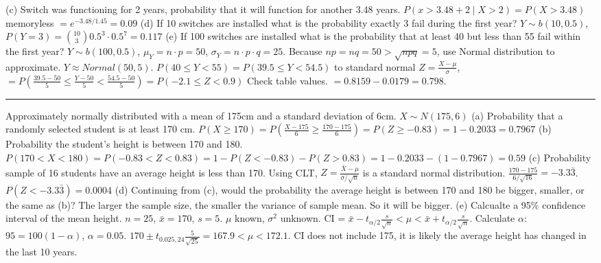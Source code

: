 \documentclass[9pt]{article}
\newcommand*\mean[1]{\bar{#1}}
\begin{document}
\begin{multicols*}{2}
    (c) Switch was functioning for 2 years, probability that it will function for another 3.48 years.
    $P(x > 3.48 + 2 \mid X>2) = P(X > 3.48) $ memoryless $ = e^{-3.48/1.45}=0.09$\newline
    (d) If 10 switches are installed what is the probability exactly 3 fail during the first year?
    $Y \sim b(10, 0.5 )$, $P(Y=3) = \binom{10}{3}0.5^3\cdot 0.5^7 = 0.117$\newline
    (e) If 100 switches are installed what is the probability that at least 40 but less than 55 fail within the first year?
    $Y\sim b(100, 0.5)$, $\mu_Y = n\cdot p = 50$, $\sigma_Y = n\cdot p\cdot q = 25$. Because $np=nq = 50 >\sqrt{npq} = 5 $, use Normal distribution to approximate. 
    $Y\approx Normal(50,5)$. $P(40 \leq Y < 55) = P(39.5 \leq Y < 54.5) $ to standard normal $Z=\frac{X-\mu}{\sigma}$,  $= P(\frac{39.5-50}{5} \leq \frac{Y-50}{5} < \frac{54.5-50}{5})
    = P(-2.1 \leq Z < 0.9) $ Check table values. $= 0.8159 - 0.0179 = 0.798$.
    \rule{0.5\textwidth}{0.4pt}
    Approximately normally distributed with a mean of 175cm and a standard deviation of 6cm. $X\sim N(175, 6)$\newline
    (a) Probability that a randomly selected student is at least 170 cm.
    $P(X\geq 170) = P(\frac{X-175}{6} \geq \frac{170-175}{6}) = P(Z\geq -0.83) = 1 - 0.2033 = 0.7967$\newline
    (b) Probability the student's height is between 170 and 180.
    $P(170 < X < 180) = P(-0.83 < Z < 0.83) = 1 - P(Z < -0.83) - P(Z > 0.83) = 1 - 0.2033 - (1 - 0.7967) = 0.59$\newline
    (c) Probability sample of 16 students have an average height is less than 170.
    Using CLT, $Z = \frac{\mean{X}-\mu}{\sigma/\sqrt{n}}$ is a standard normal distribution.
    $\frac{170 - 175}{6/\sqrt{16}} = -3.3\bar{3}$. $P(Z < -3.3\bar{3}) = 0.0004$\newline
    (d) Continuing from (c), would the probability the average height is between 170 and 180 be bigger, smaller, or the same as (b)?
    The larger the sample size, the smaller the variance of sample mean. So it will be bigger.\newline
    (e) Calcualte a 95\% confidence interval of the mean height. $n=25$, $\mean{x} = 170$, $s = 5$. $\mu$ known, $\sigma^2$ unknown.
    CI = $\mean{x}-t_{\alpha/2}\frac{s}{\sqrt{n}} < \mu < \mean{x}+t_{\alpha/2}\frac{s}{\sqrt{n}}$. Calculate $\alpha$: $95 = 100(1-\alpha)$, $\alpha = 0.05$.
    $170\pm t_{0.025,24}\frac{5}{\sqrt{25}} = 167.9 < \mu < 172.1$. CI does not include 175, it is likely the average height has changed in the last 10 years.

\end{multicols*}
\end{document}
